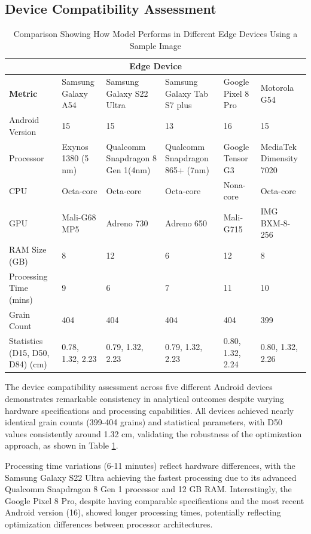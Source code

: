 \documentclass[final-report]{report-template}
\begin{document}
\subsection{Device Compatibility Assessment}
\begin{table}[!hbt]
    \centering
    \begin{tabular}{ |p{3cm}||p{2cm}|p{2cm}|p{2cm}|p{2cm}|p{2cm}| }
     \hline
     \multicolumn{6}{|c|}{\textbf{Edge Device}} \\
     \hline
     \textbf{Metric}& Samsung Galaxy A54 &Samsung Galaxy S22 Ultra&Samsung Galaxy Tab S7 plus&Google Pixel 8 Pro&Motorola G54 \\
     \hline
     Android Version   & 15    &15&   13& 16    &15\\
     \hline
     Processor&   Exynos 1380 (5 nm)  & Qualcomm Snapdragon 8 Gen 1(4nm)   &Qualcomm Snapdragon 865+ (7nm)& Google Tensor G3    &MediaTek Dimensity 7020\\
     \hline
     CPU&   Octa-core  & Octa-core   &Octa-core& Nona-core    &Octa-core\\
     \hline
     GPU&   Mali-G68 MP5  & Adreno 730   &Adreno 650& Mali-G715    &IMG BXM-8-256\\
     \hline
     RAM Size (GB) &8 & 12&  6& 12    &8\\
     \hline
     Processing Time (mins)    &9 & 6 &  7 & 11     &10 \\
     \hline
     Grain Count&   404  & 404& 404& 404    &399\\
     \hline
     Statistics (D15, D50, D84) (cm) &   0.78, 1.32, 2.23  & 0.79, 1.32, 2.23& 0.79, 1.32, 2.23& 0.80, 1.32, 2.24    &0.80, 1.32, 2.26\\
     \hline
    \end{tabular}
    \caption{Comparison Showing How Model Performs in Different Edge Devices Using a Sample Image}
    \label{tab:device-comparison}
\end{table}

The device compatibility assessment across five different Android devices demonstrates remarkable consistency in analytical outcomes despite varying hardware specifications and processing capabilities. All devices achieved nearly identical grain counts (399-404 grains) and statistical parameters, with D50 values consistently around 1.32 cm, validating the robustness of the optimization approach, as shown in Table \ref{tab:device-comparison}.

Processing time variations (6-11 minutes) reflect hardware differences, with the Samsung Galaxy S22 Ultra achieving the fastest processing due to its advanced Qualcomm Snapdragon 8 Gen 1 processor and 12 GB RAM. Interestingly, the Google Pixel 8 Pro, despite having comparable specifications and the most recent Android version (16), showed longer processing times, potentially reflecting optimization differences between processor architectures.
\end{document}
